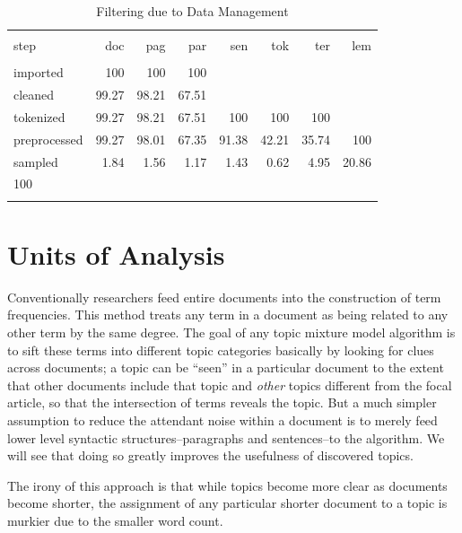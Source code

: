 \documentclass[]{book}
\begin{document}
\begin{table}[!htbp] \centering 
  \caption{Filtering due to Data Management} 
  \label{tab:filt} 
\begin{tabular}{@{\extracolsep{5pt}} lrrrrrrr} 
\\[-1.8ex]\hline 
\hline \\[-1.8ex] 
step & doc & pag & par & sen & tok & ter & lem \\ 
\hline \\[-1.8ex] 
imported & 100 & 100 & 100 &  &  &  &  \\ 
cleaned & 99.27 & 98.21 & 67.51 &  &  &  &  \\ 
tokenized & 99.27 & 98.21 & 67.51 & 100 & 100 & 100 &  \\ 
preprocessed & 99.27 & 98.01 & 67.35 & 91.38 & 42.21 & 35.74 & 100 \\ 
sampled & 1.84 & 1.56 & 1.17 & 1.43 & 0.62 & 4.95 & 20.86 \\ 
100\\%
\hline \\[-1.8ex] 
\end{tabular} 
\end{table}

\section{Units of Analysis}\label{units-of-analysis}

Conventionally researchers feed entire documents into the construction
of term frequencies. This method treats any term in a document as being
related to any other term by the same degree. The goal of any topic
mixture model algorithm is to sift these terms into different topic
categories basically by looking for clues across documents; a topic can
be ``seen'' in a particular document to the extent that other documents
include that topic and \emph{other} topics different from the focal
article, so that the intersection of terms reveals the topic. But a much
simpler assumption to reduce the attendant noise within a document is to
merely feed lower level syntactic structures--paragraphs and
sentences--to the algorithm. We will see that doing so greatly improves
the usefulness of discovered topics.

The irony of this approach is that while topics become more clear as
documents become shorter, the assignment of any particular shorter
document to a topic is murkier due to the smaller word count.
\end{document}

